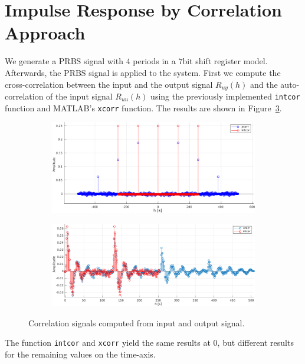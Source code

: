 \documentclass{scrartcl}
\begin{document}
\section{Impulse Response by Correlation Approach}
We generate a PRBS signal with $4$ periods in a $7$bit shift register model.
Afterwards, the PRBS signal is applied to the system.
First we compute the cross-correlation between the input and the output signal $R_{uy}(h)$ and the auto-correlation of the input signal $R_{uu}(h)$ using the previously implemented \texttt{intcor} function and MATLAB's \texttt{xcorr} function. The results are shown in Figure~\ref{fig:cross_correlations}.
\begin{figure}[h]
	\centering
	\begin{subfigure}{0.7\textwidth}
		\includegraphics[width=\textwidth]{figures/ac.pdf}
		\label{fig:cc_ac}
	\end{subfigure}
	\begin{subfigure}{0.7\textwidth}
		\includegraphics[width=\textwidth]{figures/cc.pdf}
		\label{fig:cc_cc}
	\end{subfigure}
	\caption{Correlation signals computed from input and output signal.}\label{fig:cross_correlations}
\end{figure}
The function \texttt{intcor} and \texttt{xcorr} yield the same results at $0$, but different results for the remaining values on the time-axis.
\end{document}
